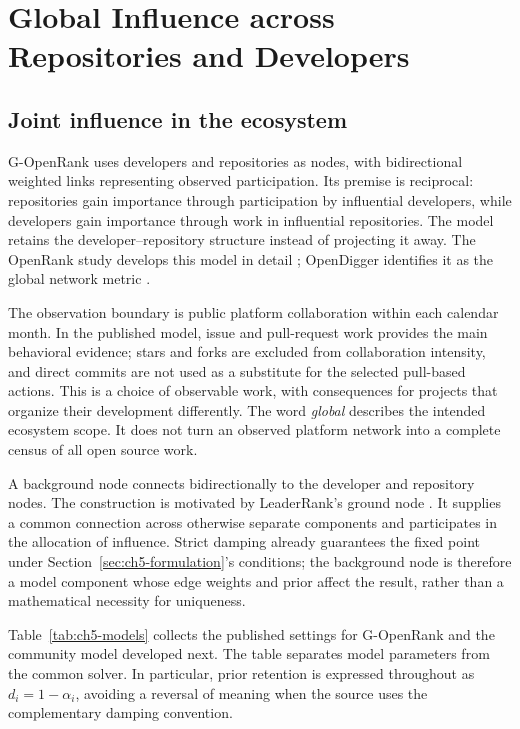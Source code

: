 \section{Global Influence across Repositories and Developers}
\label{sec:ch5-global}

\subsection{Joint influence in the ecosystem}
G-OpenRank uses developers and repositories as nodes, with bidirectional weighted links representing observed participation. Its premise is reciprocal: repositories gain importance through participation by influential developers, while developers gain importance through work in influential repositories. The model retains the developer--repository structure instead of projecting it away. The OpenRank study develops this model in detail \citep[Section 3.2]{han2026rank}; OpenDigger identifies it as the global network metric \citep[Section 3.4.1]{wang2026digger}.

The observation boundary is public platform collaboration within each calendar month. In the published model, issue and pull-request work provides the main behavioral evidence; stars and forks are excluded from collaboration intensity, and direct commits are not used as a substitute for the selected pull-based actions. This is a choice of observable work, with consequences for projects that organize their development differently. The word \emph{global} describes the intended ecosystem scope. It does not turn an observed platform network into a complete census of all open source work.

A background node connects bidirectionally to the developer and repository nodes. The construction is motivated by LeaderRank's ground node \citep{lu2011}. It supplies a common connection across otherwise separate components and participates in the allocation of influence. Strict damping already guarantees the fixed point under Section~\ref{sec:ch5-formulation}'s conditions; the background node is therefore a model component whose edge weights and prior affect the result, rather than a mathematical necessity for uniqueness.

Table~\ref{tab:ch5-models} collects the published settings for G-OpenRank and the community model developed next. The table separates model parameters from the common solver. In particular, prior retention is expressed throughout as \(d_i=1-\alpha_i\), avoiding a reversal of meaning when the source uses the complementary damping convention.

